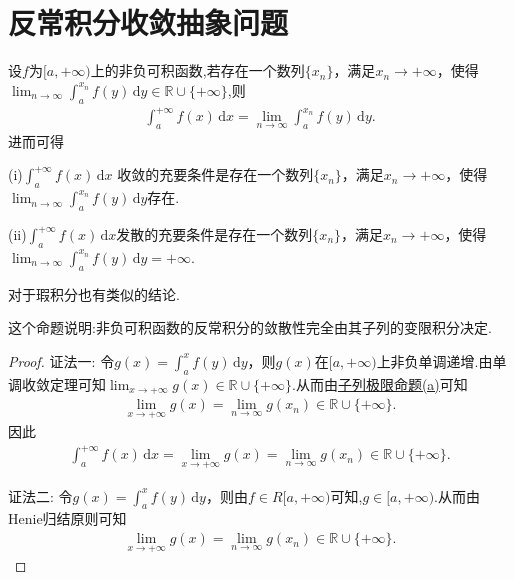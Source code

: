 \documentclass[../../main.tex]{subfiles}
\begin{document}
\section{反常积分收敛抽象问题}

\begin{proposition}\label{proposition:反常积分收敛的基本结论2}
设$f$为$[a,+\infty)$上的非负可积函数,若存在一个数列$\{x_n\}$，满足$x_n\to+\infty$，使得$\lim_{n\to\infty}\int_a^{x_n}f(y)\,\mathrm{d}y\in \mathbb{R}\cup \{+\infty\}$,则
\begin{align*}
\int_a^{+\infty}f(x)\,\mathrm{d}x=\lim_{n\to\infty}\int_a^{x_n}f(y)\,\mathrm{d}y.
\end{align*}
进而可得

(i)$\int_a^{+\infty}f(x)\,\mathrm{d}x$ 收敛的充要条件是存在一个数列$\{x_n\}$，满足$x_n\to+\infty$，使得$\lim_{n\to\infty}\int_a^{x_n}f(y)\,\mathrm{d}y$存在.

(ii)$\int_a^{+\infty}f(x)\,\mathrm{d}x$发散的充要条件是存在一个数列$\{x_n\}$，满足$x_n\to+\infty$，使得$\lim_{n\to\infty}\int_a^{x_n}f(y)\,\mathrm{d}y=+\infty$.
\end{proposition}
\begin{remark}
对于瑕积分也有类似的结论.
\end{remark}
\begin{note}
这个命题说明:非负可积函数的反常积分的敛散性完全由其子列的变限积分决定.
\end{note}
\begin{proof}
{\color{blue}证法一:}
令$g(x)=\int_a^xf(y)\,\mathrm{d}y$，则$g(x)$在$[a,+\infty)$上非负单调递增.由单调收敛定理可知$\lim_{x\to+\infty}g(x)\in\mathbb{R}\cup\{+\infty\}$.从而由\hyperref[proposition:子列极限命题]{子列极限命题(a)}可知
\begin{align*}
\lim_{x\to+\infty}g(x)=\lim_{n\to\infty}g(x_n)\in \mathbb{R}\cup \{+\infty\}.
\end{align*}
因此
\begin{align*}
\int_a^{+\infty}f(x)\,\mathrm{d}x=\lim_{x\to+\infty}g(x)=\lim_{n\to\infty}g(x_n)\in \mathbb{R}\cup \{+\infty\}.
\end{align*}

{\color{blue}证法二:}
令$g(x)=\int_a^xf(y)\,\mathrm{d}y$，则由$f\in R[a,+\infty)$可知,$g\in [a,+\infty)$.从而由Henie归结原则可知
\begin{align*}
\lim_{x\to+\infty}g(x)=\lim_{n\to\infty}g(x_n)\in \mathbb{R}\cup \{+\infty\}.
\end{align*}

\end{proof}
\end{document}
